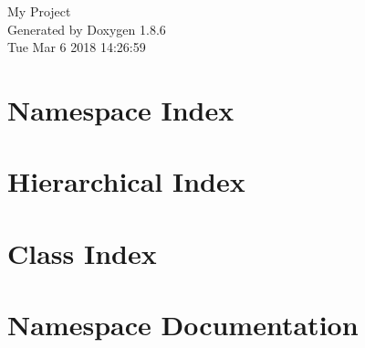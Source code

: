 \documentclass[twoside]{book}
\newcommand{\clearemptydoublepage}{%
  \newpage{\pagestyle{empty}\cleardoublepage}%
}
\begin{document}
\hypersetup{pageanchor=false}
\begin{titlepage}
\vspace*{7cm}
\begin{center}%
{\Large My Project }\\
\vspace*{1cm}
{\large Generated by Doxygen 1.8.6}\\
\vspace*{0.5cm}
{\small Tue Mar 6 2018 14:26:59}\\
\end{center}
\end{titlepage}
\clearemptydoublepage
\tableofcontents
\clearemptydoublepage
{}
\hypersetup{pageanchor=true}

\chapter{Namespace Index}

\chapter{Hierarchical Index}

\chapter{Class Index}

\chapter{Namespace Documentation}


\end{document}
